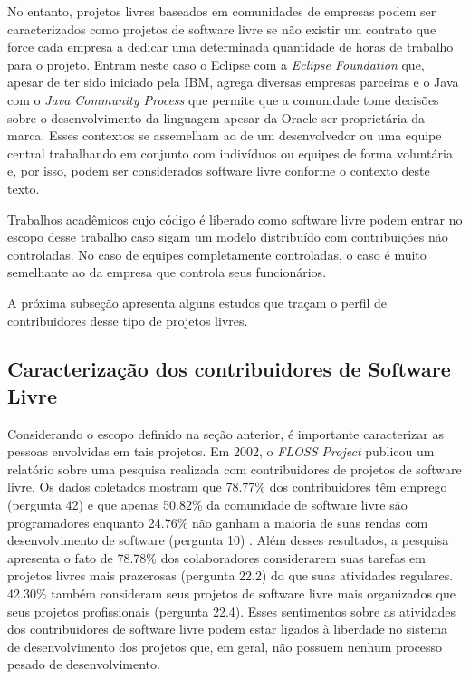 No entanto, projetos livres baseados em comunidades de empresas podem
ser caracterizados como projetos de software livre se não existir um
contrato que force cada empresa a dedicar uma determinada quantidade
de horas de trabalho para o projeto. Entram neste caso o Eclipse com a
\emph{Eclipse Foundation} que, apesar de ter sido iniciado pela IBM,
agrega diversas empresas parceiras e o Java com o \emph{Java Community
  Process} que permite que a comunidade tome decisões sobre o
desenvolvimento da linguagem apesar da Oracle ser proprietária da
marca. Esses contextos se assemelham ao de um desenvolvedor ou uma
equipe central trabalhando em conjunto com indivíduos ou equipes de
forma voluntária e, por isso, podem ser considerados software livre
conforme o contexto deste texto.

Trabalhos acadêmicos cujo código é liberado como software livre podem
entrar no escopo desse trabalho caso sigam um modelo distribuído com
contribuições não controladas. No caso de equipes completamente
controladas, o caso é muito semelhante ao da empresa que controla seus
funcionários.

A próxima subseção apresenta alguns estudos que traçam o perfil de
contribuidores desse tipo de projetos livres.

\subsection{Caracterização dos contribuidores de Software Livre}
\label{subsec:caracterizacao}

Considerando o escopo definido na seção anterior, é importante
caracterizar as pessoas envolvidas em tais projetos. Em 2002, o
\emph{FLOSS Project} \cite{FlossProject} publicou um relatório sobre
uma pesquisa realizada com contribuidores de projetos de software
livre. Os dados coletados mostram que 78.77\% dos contribuidores têm
emprego (pergunta 42) e que apenas 50.82\% da comunidade de software
livre são programadores enquanto 24.76\% não ganham a maioria de suas
rendas com desenvolvimento de software (pergunta 10)
\cite{FlossStats}. Além desses resultados, a pesquisa apresenta o fato
de 78.78\% dos colaboradores considerarem suas tarefas em projetos
livres mais prazerosas (pergunta 22.2) do que suas atividades
regulares. 42.30\% também consideram seus projetos de software livre
mais organizados que seus projetos profissionais (pergunta 22.4).
Esses sentimentos sobre as atividades dos contribuidores de software
livre podem estar ligados à liberdade no sistema de desenvolvimento
dos projetos que, em geral, não possuem nenhum processo pesado de
desenvolvimento.

